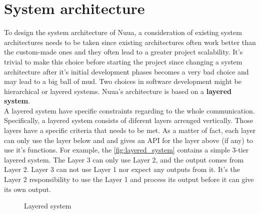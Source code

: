 \section{System architecture}

To design the system architecture of Nuua, a consideration of existing system architectures needs to be taken since existing architectures
often work better than the custom-made ones and they often lead to a greater project scalability. It's trivial
to make this choice before starting the project since changing a system architecture after it's initial
development phases becomes a very bad choice and may lead to a big ball of mud. Two choices in software development might be hierarchical
or layered systems. Nuua's architecture is based on a \textbf{layered system}.\\

\noindent
A layered system have specific constraints regarding to the whole communication. Specifically, a layered system consists
of diferent layers arrenged vertically. Those layers have a specific criteria that needs to be met. As a matter of fact,
each layer can only use the layer below and and gives an API for the layer above (if any) to use it's functions. For example,
the \autoref{fig:layered_system} contains a simple 3-tier layered system. The Layer 3 can only use Layer 2, and the output comes
from Layer 2. Layer 3 can not use Layer 1 nor expect any outputs from it. It's the Layer 2 responsibility to use the Layer 1
and process its output before it can give its own output.

\begin{figure}[H]
    \centering

    \caption{Layered system}
    \label{fig:layered_system}
\end{figure}

